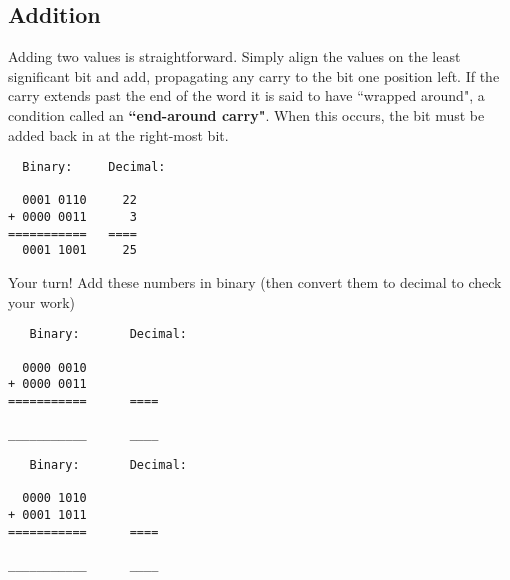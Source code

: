 
\bigskip

\subsection*{Addition}

Adding two values is straightforward. Simply align the values on the least significant bit and add, propagating any carry to the bit one position left. If the carry extends past the end of the word it is said to have ``wrapped around", a condition called an \textbf{``end-around carry"}. When this occurs, the bit must be added back in at the right-most bit. %

\begin{verbatim}
  Binary:     Decimal:
   
  0001 0110     22
+ 0000 0011      3
===========   ====
  0001 1001     25
\end{verbatim}


\bigskip

\noindent Your turn! Add these numbers in binary (then convert them to decimal to check your work)
\begin{verbatim}
   Binary:       Decimal:

  0000 0010      
+ 0000 0011      
===========      ====

___________      ____
\end{verbatim}

\bigskip


\begin{verbatim}
   Binary:       Decimal:

  0000 1010      
+ 0001 1011      
===========      ====

___________      ____
\end{verbatim}



